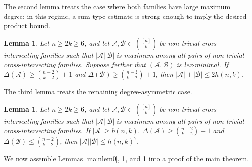 \documentclass[a4paper,11pt]{article}
\newtheorem{lemma}[theorem]{Lemma}
\newcommand{\m}{\mathcal}
\begin{document}
The second lemma treats the case where both families have large maximum degree; in this regime, a sum-type estimate is strong enough to imply the desired product bound. 


\begin{lemma}\label{mainlem1}
Let $n\ge 2k\ge 6$, and let $\mathcal{A}, \mathcal{B} \subset {[n]\choose k}$ be non-trivial cross-intersecting families such that $|\m A||\m B|$ is maximum among all pairs of non-trivial  cross-intersecting families.  
Suppose further that $(\m A, \m B)$ is lex-minimal. 
If $\Delta(\mathcal{A})\ge {n-2\choose k-2}+1$ and $\Delta(\mathcal{B})\ge {n-2\choose k-2}+1$, then  
$|\mathcal{A}|+|\mathcal{B}|\le 2h(n,k)$.
\end{lemma}

The third lemma treats the remaining degree-asymmetric case.

\begin{lemma}\label{mainlem2}
Let $n\ge 2k\ge 6$, and let $\mathcal{A}, \mathcal{B} \subset {[n]\choose k}$ be non-trivial cross-intersecting families such that $|\m A||\m B|$ is maximum among all pairs of non-trivial  cross-intersecting families.  
If $|\m A|\ge h(n,k)$, 
$\Delta(\m A)\ge {n-2\choose k-2}+1$ and $\Delta(\m B)\le {n-2\choose k-2}$, then $|\m A||\m B|\le h(n,k)^2$. 
\end{lemma}

We now assemble Lemmas \ref{mainlem0}, \ref{mainlem1}, and \ref{mainlem2} into a proof of the main theorem.
\end{document}
